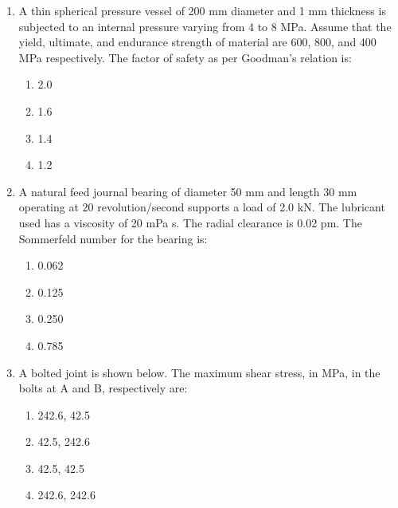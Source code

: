 \documentclass[journal,9pt,onecolumn]{IEEEtran}
\begin{document}
\begin{enumerate}
\item A thin spherical pressure vessel of 200 mm diameter and 1 mm thickness is subjected to an internal pressure varying from 4 to 8 MPa. Assume that the yield, ultimate, and endurance strength of material are 600, 800, and 400 MPa respectively. The factor of safety as per Goodman's relation is:
\begin{multicols}{4}
\begin{enumerate}
    \item 2.0
    \item 1.6
    \item 1.4
    \item 1.2
\end{enumerate}
\end{multicols}




\item  A natural feed journal bearing of diameter 50 mm and length 30 mm operating at 20 revolution/second supports a load of 2.0 kN. The lubricant used has a viscosity of 20 mPa s. The radial clearance is 0.02 pm. The Sommerfeld number for the bearing is:
\begin{multicols}{4}
\begin{enumerate}
     \item 0.062
    \item 0.125
    \item 0.250
    \item 0.785
\end{enumerate}
\end{multicols}



\item A bolted joint is shown below. The maximum shear stress, in MPa, in the bolts at A and B, respectively are:
    \begin{center}
 
 \end{center}
\begin{multicols}{4}
\begin{enumerate}
    \item 242.6, 42.5
    \item 42.5, 242.6
    \item 42.5, 42.5
    \item 242.6, 242.6
\end{enumerate}
\end{multicols}



\end{enumerate}
\end{document}
